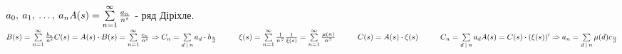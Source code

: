 \documentclass[a4paper,12pt]{bookest}
\newcommand\tab[1][1cm]{\hspace*{#1}}
\begin{document}
\begin{example}
	$a_0,\>a_1,\>\dots,\>a_n\\ A(s)=\sum\limits_{n=1}^{\infty}\frac{a_n}{n^s}$ - ряд Діріхле.\tab $B(s)=\sum\limits_{n=1}^{\infty}\frac{b_n}{n^s}\\C(s)=A(s)\cdot B(s)=\sum\limits_{n=1}^{\infty}\frac{c_n}{n^s}\Rightarrow C_n=\sum\limits_{d\>|\>n}a_d\cdot b_{\frac nd}\tab\xi(s)=\sum\limits_{n=1}^{\infty}\frac1{n^S}\\ \frac1{\xi(s)}=\sum\limits_{n=1}^{\infty}\frac{\mu(n)}{n^S}\tab C(s)=A(s)\cdot\xi(s)\tab C_n=\sum\limits_{d\>|\>n	}a_d\\ A(s)=C(s)\cdot(\xi(s))'\Rightarrow a_n=\sum\limits_{d\>|\>n}\mu(d)c_{\frac nd}$
\end{example}
\end{document}
